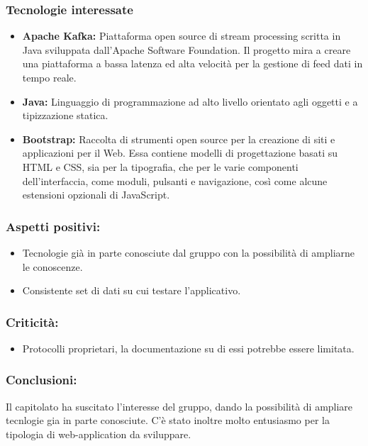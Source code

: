 	\subsubsection{Tecnologie interessate}
		\begin{itemize}
			\item \textbf{Apache Kafka:} Piattaforma open source di stream processing scritta in Java sviluppata dall'Apache Software Foundation. Il progetto mira a creare una piattaforma a bassa latenza ed alta velocità per la gestione di feed dati in tempo reale.
			\item \textbf{Java:} Linguaggio di programmazione ad alto livello orientato agli oggetti e a tipizzazione statica.
			\item \textbf{Bootstrap:} Raccolta di strumenti open source per la creazione di siti e applicazioni per il Web. Essa contiene modelli di progettazione basati su HTML e CSS, sia per la tipografia, che per le varie componenti dell'interfaccia, come moduli, pulsanti e navigazione, così come alcune estensioni opzionali di JavaScript.
		\end{itemize}

	\subsubsection{Aspetti positivi:}
		\begin{itemize}
			\item Tecnologie già in parte conosciute dal gruppo con la possibilità di ampliarne le conoscenze.
			\item Consistente set di dati su cui testare l'applicativo.
		\end{itemize}
	
	\subsubsection{Criticità:}
		\begin{itemize}
			\item Protocolli proprietari, la documentazione su di essi potrebbe essere limitata.
		\end{itemize}
		
	\subsubsection{Conclusioni:}
		Il capitolato ha suscitato l'interesse del gruppo, dando la possibilità di ampliare tecnlogie gia in parte conosciute. C'è stato inoltre molto entusiasmo per la tipologia di web-application da sviluppare.

